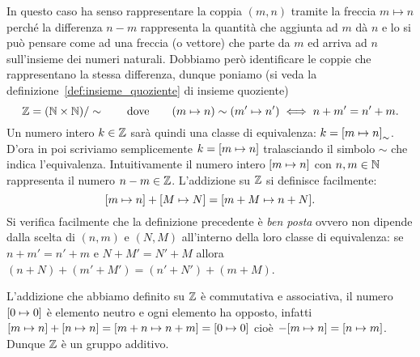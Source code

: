 In questo caso ha senso rappresentare la coppia $(m,n)$ 
tramite la freccia $m\mapsto n$ perché la differenza $n-m$ 
rappresenta la quantità che aggiunta ad $m$ dà $n$
e lo si può pensare come ad una freccia (o vettore) che parte da $m$ 
ed arriva ad $n$ sull'insieme dei numeri naturali.
Dobbiamo però identificare le coppie che rappresentano la stessa differenza,
dunque poniamo (si veda la definizione~\ref{def:insieme_quoziente}  
di insieme quoziente)
\[
  {\mathbb Z} = ({\mathbb N} \times {\mathbb N})/\sim
  \qquad\text{dove}\qquad
  (m\mapsto n)\sim (m' \mapsto n')\iff n+m' = n'+m.
\]
Un numero intero $k\in {\mathbb Z}$ sarà quindi una classe di equivalenza:
$k = {\left[ m \mapsto n \right]}_\sim$. 
D'ora in poi scriviamo semplicemente $k={\left[ m\mapsto n \right]}$
tralasciando il simbolo $\sim$ che indica l'equivalenza.
Intuitivamente il numero intero ${\left[ m\mapsto n \right]}$ con $n,m\in {\mathbb N}$ 
rappresenta il numero $n-m\in {\mathbb Z}$.
L'addizione su ${\mathbb Z}$ si definisce facilmente:
\[
 {\left[ m \mapsto n \right]}+{\left[ M\mapsto N \right]} = {\left[ m+M \mapsto n+N \right]}.
\]
%
Si verifica facilmente che la definizione precedente è \emph{ben posta}
ovvero non dipende dalla scelta di $(n,m)$ e $(N,M)$ all'interno 
della loro classe di equivalenza: se $n+m' = n'+m$ e $N+M'=N'+M$ 
allora $(n+N)+(m'+M')=(n'+N')+(m+M)$.

L'addizione che abbiamo definito su ${\mathbb Z}$ è commutativa e associativa, 
il numero ${\left[ 0 \mapsto 0 \right]}$
è elemento neutro e ogni elemento ha opposto, infatti 
${\left[ m \mapsto n \right]} + {\left[ n \mapsto n \right]} 
= {\left[ m+n \mapsto n+m \right]} = {\left[ 0\mapsto 0 \right]}$
cioè $-{\left[ m \mapsto n \right]}={\left[ n\mapsto m \right]}$.
Dunque ${\mathbb Z}$ è un gruppo additivo.

